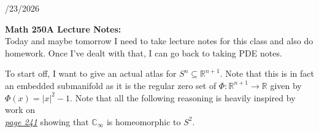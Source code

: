 \documentclass{book}
\newcommand{\inLinkRap}[2]{{\color{blue}\hyperlink{#1}{\textit{#2}}}}
\newcommand{\hTwo}{%
\color{Black}%
   \fontsize{13}{15}\selectfont%
}
\newcommand{\blect}[1]{{\color{MidnightBlue}\textbf{#1}}}
\newcommand{\retTwo}{\hfill\bigbreak}
\newcommand{\dispDate}[1]{{
   \color{Black}%
   \fontsize{20}{18}\selectfont%
   #1\retTwo
}}
\begin{document}
\hTwo\dispDate{10/23/2026}


\blect{Math 250A Lecture Notes:}\\
Today and maybe tomorrow I need to take lecture notes for this class and also do\\ homework. Once I've dealt with that, I can go back to taking PDE notes.\retTwo

To start off, I want to give an actual atlas for $S^n \subseteq \mathbb{R}^{n+1}$. Note that this is in fact\\ an embedded submanifold as it is the regular zero set of $\Phi: \mathbb{R}^{n+1} \to \mathbb{R}$ given by\\ $\Phi(x) = |x|^2 - 1$. Note that all the following reasoning is heavily inspired by work on\\ \inLinkRap{placeholder}{page 241} showing that $\mathbb{C}_\infty$ is homeomorphic to $S^2$.
\end{document}
